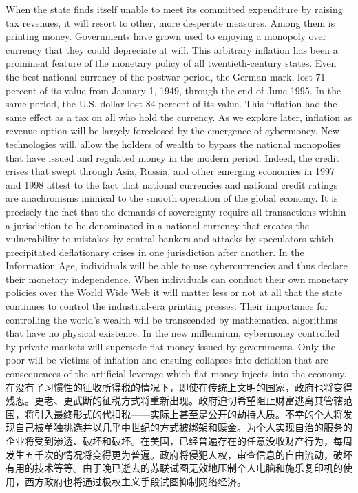 \begin{paracol}{2}[]
When the state finds itself unable to meet its committed expenditure by raising tax revenues, it will resort to other, more desperate measures. Among them is printing money. Governments have grown used to enjoying a monopoly over currency that they could depreciate at will. This arbitrary inflation has been a prominent feature of the monetary policy of all twentieth-century states. Even the best national currency of the postwar period, the German mark, lost 71 percent of its value from January 1, 1949, through the end of June 1995. In the same period, the U.S. dollar lost 84 percent of its value. This inflation had the same effect as a tax on all who hold the currency. As we explore later, inflation as revenue option will be largely foreclosed by the emergence of cybermoney. New technologies will. allow the holders of wealth to bypass the national monopolies that have issued and regulated money in the modern period. Indeed, the credit crises that swept through Asia, Russia, and other emerging economies in 1997 and 1998 attest to the fact that national currencies and national credit ratings are anachronisms inimical to the smooth operation of the global economy. It is precisely the fact that the demands of sovereignty require all transactions within a jurisdiction to be denominated in a national currency that creates the vulnerability to mistakes by central bankers and attacks by speculators which precipitated deflationary crises in one jurisdiction after another. In the Information Age, individuals will be able to use cybercurrencies and thus declare their monetary independence. When individuals can conduct their own monetary policies over the World Wide Web it will matter less or not at all that the state continues to control the industrial-era printing presses. Their importance for controlling the world's wealth will be transcended by mathematical algorithms that have no physical existence. In the new millennium, cybermoney controlled by private markets will supersede fiat money issued by governments. Only the poor will be victims of inflation and ensuing collapses into deflation that are consequences of the artificial leverage which fiat money injects into the economy.
\switchcolumn*
在没有了习惯性的征收所得税的情况下，即使在传统上文明的国家，政府也将变得残忍。更老、更武断的征税方式将重新出现。政府迫切希望阻止财富逃离其管辖范围，将引入最终形式的代扣税——实际上甚至是公开的劫持人质。不幸的个人将发现自己被单独挑选并以几乎中世纪的方式被绑架和赎金。为个人实现自治的服务的企业将受到渗透、破坏和破坏。在美国，已经普遍存在的任意没收财产行为，每周发生五千次的情况将变得更为普遍。政府将侵犯人权，审查信息的自由流动，破坏有用的技术等等。由于晚已逝去的苏联试图无效地压制个人电脑和施乐复印机的使用，西方政府也将通过极权主义手段试图抑制网络经济。

\end{paracol}
